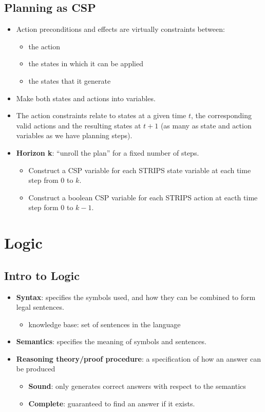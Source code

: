 \documentclass{article}
\begin{document}
\subsection{Planning as CSP}

\begin{itemize}
    \item Action preconditions and effects are virtually constraints between:
        \begin{itemize}
            \item the action
            \item the states in which it can be applied
            \item the states that it generate
        \end{itemize}
    \item Make both states and actions into variables.
    \item The action constraints relate to states at a given time $t$, the corresponding valid actions and the resulting states at $t+1$ (as many as state and action variables as we have planning steps).
    \item \textbf{Horizon k}: ``unroll the plan'' for a fixed number of steps.
        \begin{itemize}
            \item Construct a CSP variable for each STRIPS state variable at each time step from 0 to $k$.
            \item Construct a boolean CSP variable for each STRIPS action at eacth time step form 0 to $k-1$.
        \end{itemize}
\end{itemize}

\section{Logic}

\subsection{Intro to Logic}

\begin{itemize}
    \item \textbf{Syntax}: specifies the symbols used, and how they can be combined to form legal sentences.
        \begin{itemize}
            \item knowledge base: set of sentences in the language
        \end{itemize}
    \item \textbf{Semantics}: specifies the meaning of symbols and sentences.
    \item \textbf{Reasoning theory/proof procedure}: a specification of how an answer can be produced
        \begin{itemize}
            \item \textbf{Sound}: only generates correct answers with respect to the semantics
            \item \textbf{Complete}: guaranteed to find an answer if it exists.
        \end{itemize}
\end{itemize}
\end{document}
